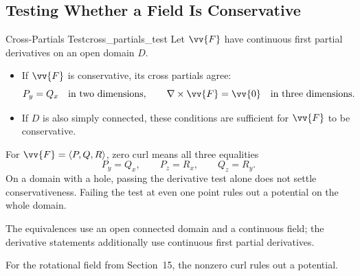 \newpage
\subsection{Testing Whether a Field Is Conservative}
\begin{theorem}{Cross-Partials Test}{cross_partials_test}
Let $\vv{F}$ have continuous first partial derivatives on an open domain $D$.
\begin{itemize}
    \item If $\vv{F}$ is conservative, its cross partials agree:
    \[
        P_y = Q_x\quad\text{in two dimensions},\qquad
        \nabla\times\vv{F} = \vv{0}\quad\text{in three dimensions}.
    \]
    \item If $D$ is also simply connected, these conditions are sufficient for $\vv{F}$ to be conservative.
\end{itemize}
\end{theorem}
For $\vv{F} = \ang{P,Q,R}$, zero curl means all three equalities
\[
    P_y = Q_x,\qquad P_z = R_x,\qquad Q_z = R_y.
\]
On a domain with a hole, passing the derivative test alone does not settle conservativeness. Failing the test at even one point rules out a potential on the whole domain.

\begin{center}
\end{center}
The equivalences use an open connected domain and a continuous field; the derivative statements additionally use continuous first partial derivatives.

For the rotational field from Section~15, the nonzero curl rules out a potential.

